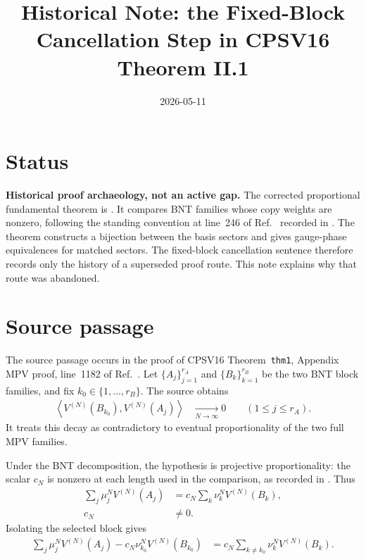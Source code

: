 \documentclass{article}
\title{Historical Note: the Fixed-Block Cancellation Step in CPSV16 Theorem II.1}
\author{}
\date{2026-05-11}
\begin{document}
\maketitle
{}

\section{Status}

\textbf{Historical proof archaeology, not an active gap.}
The corrected proportional fundamental theorem is
. It compares
BNT families whose copy weights are nonzero, following the standing convention
at line~246 of Ref.~\cite{Cirac2016MPDO_arXiv} recorded in
. The theorem
constructs a bijection between the basis sectors and gives gauge-phase
equivalences for matched sectors. The fixed-block cancellation sentence
therefore records only the history of a superseded proof route. This note
explains why that route was abandoned.

\section{Source passage}

The source passage occurs in the proof of CPSV16
Theorem~\texttt{thm1}, Appendix MPV proof, line~1182 of
Ref.~\cite{Cirac2016MPDO_arXiv}. Let
$\{A_j\}_{j=1}^{r_A}$ and $\{B_k\}_{k=1}^{r_B}$ be the two BNT block
families, and fix $k_0\in\{1,\ldots,r_B\}$. The source obtains
\begin{align}
    \left\langle
        V^{(N)}(B_{k_0}),V^{(N)}(A_j)
    \right\rangle
        &\xrightarrow[N\to\infty]{}0
        \qquad (1\leq j\leq r_A).
    \label{eq:cpsv16_fixed_block_cancellation_fixed_block_overlap_decay}
\end{align}
It treats this decay as contradictory to eventual proportionality of the two
full MPV families.

Under the BNT decomposition, the hypothesis is projective proportionality:
the scalar $c_N$ is nonzero at each length used in the comparison, as recorded
in
. Thus
\begin{align}
    \sum_j\mu_j^NV^{(N)}(A_j)
        &= c_N\sum_k\nu_k^NV^{(N)}(B_k),
    \label{eq:cpsv16_fixed_block_cancellation_full_projective_proportionality}\\
    c_N
        &\neq 0.
    \label{eq:cpsv16_fixed_block_cancellation_nonzero_projective_scalar}
\end{align}
Isolating the selected block gives
\begin{align}
    \sum_j\mu_j^NV^{(N)}(A_j)
        -c_N\nu_{k_0}^NV^{(N)}(B_{k_0})
        &= c_N\sum_{k\neq k_0}\nu_k^NV^{(N)}(B_k).
    \label{eq:cpsv16_fixed_block_cancellation_selected_block_isolation}
\end{align}
\end{document}
